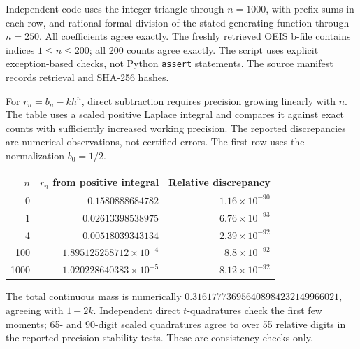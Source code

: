 Independent code uses the integer triangle through $n=1000$, with prefix sums
in each row, and rational formal division of the stated generating function
through $n=250$. All coefficients agree exactly. The freshly retrieved OEIS
b-file contains indices $1\le n\le200$; all 200 counts agree exactly.
The script uses explicit exception-based checks, not Python \texttt{assert}
statements. The source manifest records retrieval and SHA-256 hashes.

For $r_n=b_n-kh^n$, direct subtraction requires precision growing linearly
with $n$. The table uses a scaled positive Laplace integral and compares it
against exact counts with sufficiently increased working precision. The
reported discrepancies are numerical observations, not certified errors.
The first row uses the normalization $b_0=1/2$.
\begin{center}
\begin{tabular}{rrr}
\toprule
$n$ & $r_n$ from positive integral & Relative discrepancy \\
\midrule
0 & $0.1580888684782$ & $1.16\times10^{-90}$ \\
1 & $0.02613398538975$ & $6.76\times10^{-93}$ \\
4 & $0.00518039343134$ & $2.39\times10^{-92}$ \\
100 & $1.895125258712\times10^{-4}$ & $8.8\times10^{-92}$ \\
1000 & $1.020228640383\times10^{-5}$ & $8.12\times10^{-92}$ \\
\bottomrule
\end{tabular}
\end{center}
The total continuous mass is numerically
$0.316177736956408984232149966021$, agreeing with $1-2k$.
Independent direct $t$-quadratures check the first few moments; 65- and
90-digit scaled quadratures agree to over 55 relative digits in the
reported precision-stability tests. These are consistency checks only.

